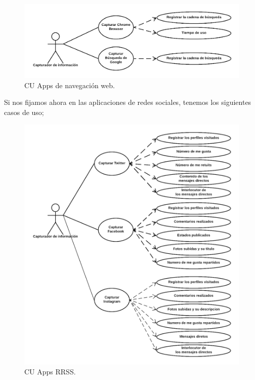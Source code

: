 \documentclass[12pt,a4paper,oneside]{book} %
\begin{document}
\begin{figure}[H]
	\begin{center}
		\includegraphics[scale=0.30]{pictures/usecases/usecases04.png} %
	\end{center}
	\caption[Casos de uso 04]{CU Apps de navegación web.}
\end{figure}
Si nos fijamos ahora en las aplicaciones de redes sociales, tenemos los siguientes casos de uso; 
\begin{figure}[H]
	\begin{center}
		\includegraphics[scale=0.30]{pictures/usecases/usecases05.png} %
	\end{center}
	\caption[Casos de uso 05]{CU Apps RRSS.}
\end{figure}
\end{document}
